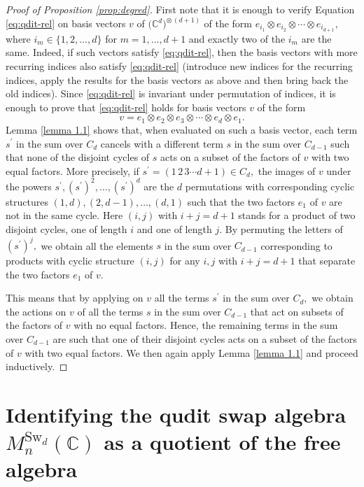 \documentclass[12pt,dvipsnames,accepted=2016-08-18,a4paper,onecolumn]{quantumarticle}
\numberwithin{equation}{section}
\theoremstyle{definition}
\begin{document}
\begin{proof}[Proof of Proposition \ref{prop:degred}] 
	First note that it is enough to verify Equation \eqref{eq:qdit-rel} on basis vectors $v$ of $\big(\mathbb{C}^d\big)^{\otimes\, (d+1)}$ of the form $e_{i_1}\otimes e_{i_2} \otimes \cdots \otimes e_{i_{d+1}},$ where $i_m \in \{1,2,\ldots,d\}$ for $m=1, \ldots, d+1$ and exactly two of the $i_m$ are the same. Indeed, if such vectors satisfy \eqref{eq:qdit-rel}, then the basis vectors with more recurring indices also satisfy \eqref{eq:qdit-rel} (introduce new indices for the recurring indices, apply the results for the basis vectors as above and then bring back the old indices). 
 Since \eqref{eq:qdit-rel} is invariant under permutation of indices, it is enough to prove that \ref{eq:qdit-rel} holds for basis vectors $v$ of the form 
 $$
 v = e_{1} \otimes e_2 \otimes e_3 \otimes \cdots \otimes e_d \otimes e_1.
$$	
Lemma \ref{lemma 1.1} shows that, when evaluated on such a basis vector, each term $s^\prime$ in the sum over $C_d$ cancels with a different term $s$ in the sum over $C_{d-1}$ such that none of the disjoint cycles of $s$ acts on a subset of the factors of $v$ with two equal factors. More precisely, if $s^\prime = (1\,2\,3\cdots d+1) \in C_d,$ the images of $v$ under the powers $s^\prime, (s^\prime)^2,\ldots,(s^\prime)^d$ are the $d$ permutations with corresponding cyclic structures $(1,d),(2,d-1),\ldots,(d,1)$ such that the two factors $e_1$ of $v$ are not in the same cycle.
Here $(i,j)$ with $i+j=d+1$ stands for a product of two disjoint cycles, one of length $i$ and one of length $j.$   By permuting the letters of $(s^\prime)^j,$
we obtain all the elements $s$ in the sum over $C_{d-1}$ 
corresponding to products with cyclic structure $(i,j)$ 
for any $i,j$ with $i+j=d+1$ 
that separate the two factors $e_1$ of $v.$

This means that by applying on $v$ all the terms $s^\prime$ in the sum over $C_d,$  we obtain the actions on $v$ of all the terms $s$  in the sum over $C_{d-1}$ that act on subsets of the factors of $v$ with no equal factors. 
 Hence, the remaining terms in the sum over $C_{d-1}$ are such that one of their disjoint cycles acts on a subset of the factors of $v$ with two equal factors. We then again apply Lemma \ref{lemma 1.1} and proceed inductively.
\end{proof}



\section{Identifying the qudit swap algebra $M^{\text{Sw}_d}_n(\mathbb{C})$ as a quotient of the free algebra}\label{s:quotalg}
\end{document}
